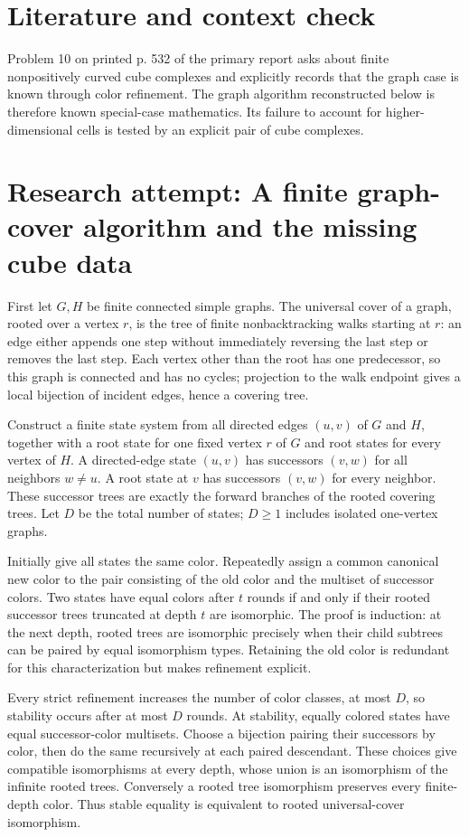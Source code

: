 \documentclass[11pt]{article}
\begin{document}
\section{Literature and context check}
Problem 10 on printed p. 532 of the primary report asks about finite nonpositively curved cube complexes and explicitly records that the graph case is known through color refinement. The graph algorithm reconstructed below is therefore known special-case mathematics. Its failure to account for higher-dimensional cells is tested by an explicit pair of cube complexes.
\section{Research attempt: A finite graph-cover algorithm and the missing cube data}

First let $G,H$ be finite connected simple graphs. The universal cover of a graph, rooted over a vertex $r$, is the tree of finite nonbacktracking walks starting at $r$: an edge either appends one step without immediately reversing the last step or removes the last step. Each vertex other than the root has one predecessor, so this graph is connected and has no cycles; projection to the walk endpoint gives a local bijection of incident edges, hence a covering tree.

Construct a finite state system from all directed edges $(u,v)$ of $G$ and $H$, together with a root state for one fixed vertex $r$ of $G$ and root states for every vertex of $H$. A directed-edge state $(u,v)$ has successors $(v,w)$ for all neighbors $w\ne u$. A root state at $v$ has successors $(v,w)$ for every neighbor. These successor trees are exactly the forward branches of the rooted covering trees. Let $D$ be the total number of states; $D\geq1$ includes isolated one-vertex graphs.

Initially give all states the same color. Repeatedly assign a common canonical new color to the pair consisting of the old color and the multiset of successor colors. Two states have equal colors after $t$ rounds if and only if their rooted successor trees truncated at depth $t$ are isomorphic. The proof is induction: at the next depth, rooted trees are isomorphic precisely when their child subtrees can be paired by equal isomorphism types. Retaining the old color is redundant for this characterization but makes refinement explicit.

Every strict refinement increases the number of color classes, at most $D$, so stability occurs after at most $D$ rounds. At stability, equally colored states have equal successor-color multisets. Choose a bijection pairing their successors by color, then do the same recursively at each paired descendant. These choices give compatible isomorphisms at every depth, whose union is an isomorphism of the infinite rooted trees. Conversely a rooted tree isomorphism preserves every finite-depth color. Thus stable equality is equivalent to rooted universal-cover isomorphism.
\end{document}
